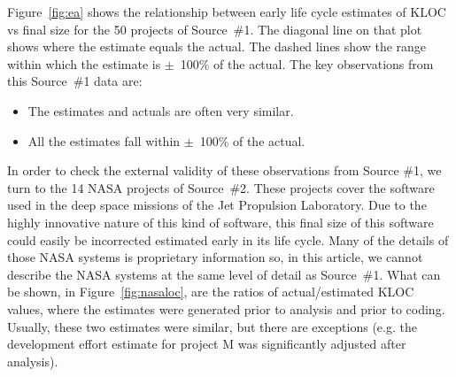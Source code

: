 \documentclass[final,twocolumn]{elsarticle}
\newcommand{\bi}{\begin{itemize}[leftmargin=0.4cm]}
\newcommand{\ei}{\end{itemize}}
\newcommand{\fig}[1]{Figure~\ref{fig:#1}}
\theoremstyle{break}
\begin{document}
\fig{ea} shows the relationship between early life cycle estimates of KLOC vs final size for the 50
projects of Source~\#1. The diagonal line on that plot shows where the estimate equals the actual.
The dashed lines show the range within which the estimate is $\pm$~100\% of the actual.
The key observations from this Source~\#1 data are:
\bi
\item The estimates and actuals are often very similar.
  \item All the estimates fall within $\pm$~100\% of the actual.
    \ei
    
  In order to check the external validity of these observations from Source \#1,
  we turn to the 14 NASA projects of Source~\#2. These projects cover the software used in the deep space missions of the
  Jet Propulsion Laboratory. Due to the highly innovative nature of this kind of
  software, this final size of this software could easily be incorrected
  estimated early in its life cycle.  Many of the details of those NASA systems
  is proprietary information so, in this article, we cannot describe the NASA
  systems at the same level of detail as Source~\#1. What  can be shown, in \fig{nasaloc},
  are the  ratios of actual/estimated KLOC values, where the estimates were generated
  prior to analysis and prior to coding. Usually, these two estimates were similar, but there
  are exceptions (e.g. the development effort estimate for project M was significantly
  adjusted after analysis).
\end{document}
